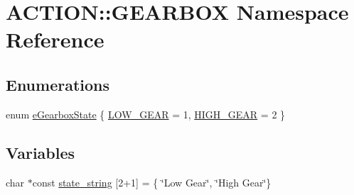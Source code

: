 \hypertarget{namespace_a_c_t_i_o_n_1_1_g_e_a_r_b_o_x}{
\section{\-A\-C\-T\-I\-O\-N\-:\-:\-G\-E\-A\-R\-B\-O\-X \-Namespace \-Reference}
\label{namespace_a_c_t_i_o_n_1_1_g_e_a_r_b_o_x}
}
\subsection*{\-Enumerations}
\begin{DoxyCompactItemize}
\item 
enum \hyperlink{namespace_a_c_t_i_o_n_1_1_g_e_a_r_b_o_x_a8179b997ab110ef861a939c97ac38fcb}{e\-Gearbox\-State} \{ \hyperlink{namespace_a_c_t_i_o_n_1_1_g_e_a_r_b_o_x_a8179b997ab110ef861a939c97ac38fcbafb2680bc37560bead0b790143759139f}{\-L\-O\-W\-\_\-\-G\-E\-A\-R} =  1, 
\hyperlink{namespace_a_c_t_i_o_n_1_1_g_e_a_r_b_o_x_a8179b997ab110ef861a939c97ac38fcbaa578bf4695a0f757e2177db5a9851c51}{\-H\-I\-G\-H\-\_\-\-G\-E\-A\-R} =  2
 \}
\end{DoxyCompactItemize}
\subsection*{\-Variables}
\begin{DoxyCompactItemize}
\item 
char $\ast$const \hyperlink{namespace_a_c_t_i_o_n_1_1_g_e_a_r_b_o_x_a2bee88f7e4a506d457c2e532d5e92aa8}{state\-\_\-string} \mbox{[}2+1\mbox{]} = \{ \char`\"{}\-Low \-Gear\char`\"{}, \char`\"{}\-High \-Gear\char`\"{}\}
\end{DoxyCompactItemize}


